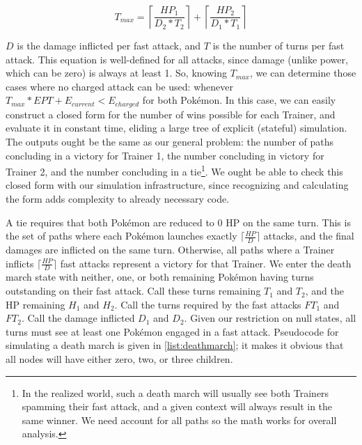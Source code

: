 \[ T_{max} = \left\lceil\frac{HP_1}{D_2 * T_2}\right\rceil + \left\lceil\frac{HP_2}{D_1 * T_1}\right\rceil \]

$D$ is the damage inflicted per fast attack, and $T$ is the number of turns per fast attack.
This equation is well-defined for all attacks, since damage (unlike power,
  which can be zero) is always at least 1.
So, knowing $T_{max}$, we can determine those cases where no charged attack
  can be used: whenever $T_{max} * EPT + E_{current} < E_{charged}$ for both Pokémon.
In this case, we can easily construct a closed form for the number of wins
  possible for each Trainer, and evaluate it in constant time, eliding
  a large tree of explicit (stateful) simulation.
The outputs ought be the same as our general problem: the number of paths
  concluding in a victory for Trainer 1, the number concluding in victory for
  Trainer 2, and the number concluding in a tie\footnote{In the realized world,
  such a death march will usually see both Trainers spamming their fast attack,
  and a given context will always result in the same winner. We need account
  for all paths so the math works for overall analysis.}.
We ought be able to check this closed form with our simulation infrastructure,
  since recognizing and calculating the form adds complexity to
  already necessary code.

A tie requires that both Pokémon are reduced to 0 HP on the same turn.
This is the set of paths where each Pokémon launches exactly $\lceil\frac{HP}{D}\rceil$
  attacks, and the final damages are inflicted on the same turn.
Otherwise, all paths where a Trainer inflicts $\lceil\frac{HP}{D}\rceil$ fast attacks
  represent a victory for that Trainer.
We enter the death march state with neither, one, or both remaining Pokémon having
  turns outstanding on their fast attack.
Call these turns remaining $T_1$ and $T_2$, and the HP remaining $H_1$ and $H_2$.
Call the turns required by the fast attacks $FT_1$ and $FT_2$.
Call the damage inflicted $D_1$ and $D_2$.
Given our restriction on null states, all turns must see at least one Pokémon engaged
  in a fast attack.
Pseudocode for simulating a death march is given in \autoref{list:deathmarch}; it
  makes it obvious that all nodes will have either zero, two, or three children.

